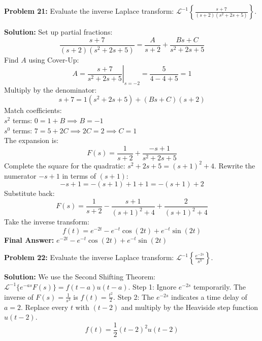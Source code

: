 \documentclass[11pt, letterpaper]{article}
\theoremstyle{definition}
\theoremstyle{remark}
\begin{document}
\textbf{Problem 21:} Evaluate the inverse Laplace transform: $\displaystyle \mathcal{L}^{-1} \left\{ \frac{s + 7}{(s+2)(s^2 + 2s + 5)} \right\}$.

\textbf{Solution:}
Set up partial fractions:
\[
\frac{s + 7}{(s+2)(s^2 + 2s + 5)} = \frac{A}{s+2} + \frac{Bs + C}{s^2 + 2s + 5}
\]
Find $A$ using Cover-Up:
\[
A = \left. \frac{s + 7}{s^2 + 2s + 5} \right|_{s=-2} = \frac{5}{4 - 4 + 5} = 1
\]
Multiply by the denominator:
\[
s + 7 = 1(s^2 + 2s + 5) + (Bs + C)(s+2)
\]
Match coefficients: \\
$s^2$ terms: $0 = 1 + B \implies B = -1$ \\
$s^0$ terms: $7 = 5 + 2C \implies 2C = 2 \implies C = 1$ \\
The expansion is:
\[
F(s) = \frac{1}{s+2} + \frac{-s + 1}{s^2 + 2s + 5}
\]
Complete the square for the quadratic: $s^2 + 2s + 5 = (s+1)^2 + 4$.
Rewrite the numerator $-s + 1$ in terms of $(s+1)$:
\[
-s + 1 = -(s+1) + 1 + 1 = -(s+1) + 2
\]
Substitute back:
\[
F(s) = \frac{1}{s+2} - \frac{s+1}{(s+1)^2 + 4} + \frac{2}{(s+1)^2 + 4}
\]
Take the inverse transform:
\[
f(t) = e^{-2t} - e^{-t}\cos(2t) + e^{-t}\sin(2t)
\]
\textbf{Final Answer:} $\displaystyle e^{-2t} - e^{-t}\cos(2t) + e^{-t}\sin(2t)$

\vspace{1em}

\textbf{Problem 22:} Evaluate the inverse Laplace transform: $\displaystyle \mathcal{L}^{-1} \left\{ \frac{e^{-2s}}{s^3} \right\}$.

\textbf{Solution:}
We use the Second Shifting Theorem: $\mathcal{L}^{-1}\{e^{-as}F(s)\} = f(t-a)u(t-a)$.
Step 1: Ignore $e^{-2s}$ temporarily. The inverse of $F(s) = \frac{1}{s^3}$ is $f(t) = \frac{t^2}{2}$.
Step 2: The $e^{-2s}$ indicates a time delay of $a = 2$. Replace every $t$ with $(t-2)$ and multiply by the Heaviside step function $u(t-2)$.
\[
f(t) = \frac{1}{2}(t-2)^2 u(t-2)
\]

\begin{center}
\end{center}
\end{document}
